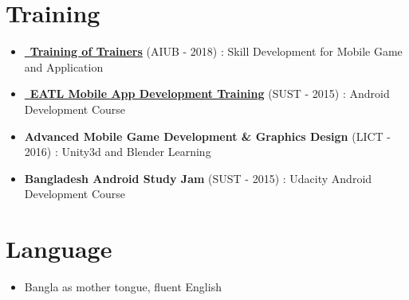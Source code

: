 \documentclass[letterpaper,11pt]{article}
\newcommand{\resumeItem}[1]{
  \item\small{
    {#1 \vspace{-2pt}}
  }
}
\newcommand{\resumeItemListStart}{\begin{itemize}}
\newcommand{\resumeItemListEnd}{\end{itemize}\vspace{-5pt}}
\begin{document}
\section{Training}
  \resumeItemListStart
    \resumeItem
      {\href{https://gameapp.gov.bd/}{\raisebox{-0.2\height}\ \underline{\textbf{Training of Trainers}}} (AIUB - 2018) :
      {Skill Development for Mobile Game and Application}}
        \resumeItem
        {\href{https://www.eatlbd.com/index.php?r=site/products&id=4}{\raisebox{-0.2\height}\ \underline{\textbf{EATL Mobile App Development Training}}} (SUST - 2015) : {Android Development Course}}
        \resumeItem
      {\textbf{Advanced Mobile Game Development \& Graphics Design} (LICT - 2016) :
      {Unity3d and Blender Learning}}
        \resumeItem
      {\textbf{Bangladesh Android Study Jam} (SUST - 2015) :
      {Udacity Android Development Course}}
  \resumeItemListEnd
\vspace{-10pt}

\section{Language}
  \resumeItemListStart
    \resumeItem
      {Bangla as mother tongue, fluent English}
  \resumeItemListEnd
  
\end{document}
